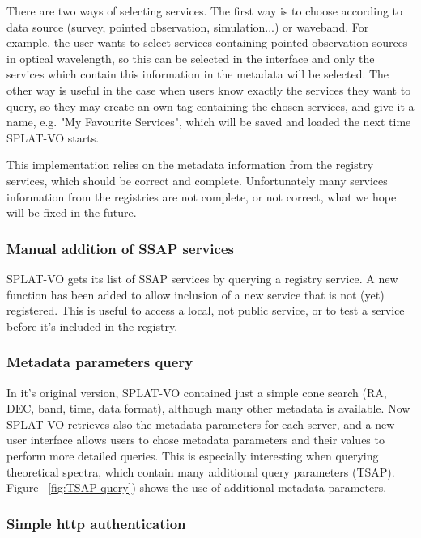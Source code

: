 \documentclass[final,authoryear,5p,times,twocolumn]{elsarticle}
\begin{document}
There are two ways of selecting services. The first way is to choose
according to data source (survey, pointed observation, simulation...)
or waveband.  For example, the user wants to select services
containing pointed observation sources in optical wavelength, so this
can be selected in the interface and only the services which contain
this information in the metadata will be selected.  The other way is
useful in the case when users know exactly the services they want to
query, so they may create an own tag containing the chosen services,
and give it a name, e.g. "My Favourite Services", which will be saved
and loaded the next time SPLAT-VO starts.

This implementation relies on the metadata information from the
registry services, which should be correct and complete. Unfortunately
many services information from the registries are not complete, or not
correct, what we hope will be fixed in the future.



\subsubsection{Manual addition of SSAP services}

SPLAT-VO gets its list of SSAP services by querying a registry
service.  A new function has been added to allow inclusion of a new
service that is not (yet) registered. This is useful to access a
local, not public service, or to test a service before it's included
in the registry.

\subsubsection{Metadata parameters query}

In it's original version, SPLAT-VO contained just a simple cone search
(RA, DEC, band, time, data format), although many other metadata is
available.  Now SPLAT-VO retrieves also the metadata parameters for each
server, and a new user interface allows users to chose metadata
parameters and their values to perform more detailed queries.  This is
especially interesting when querying theoretical spectra, which
contain many additional query parameters (TSAP). Figure ~\ref{fig:TSAP-query})
shows the use of additional metadata parameters.

\subsubsection{Simple http authentication}
\end{document}
